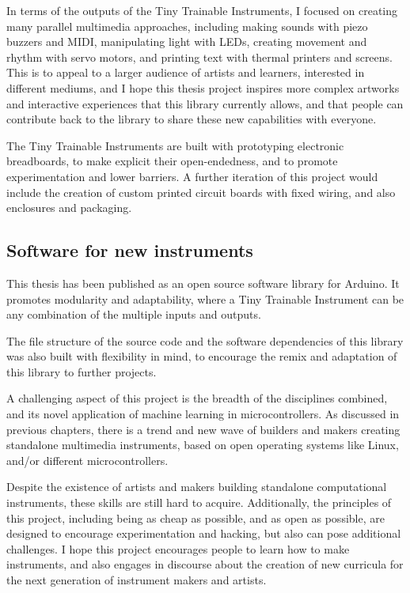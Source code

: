 In terms of the outputs of the Tiny Trainable Instruments, I focused on creating many parallel multimedia approaches, including making sounds with piezo buzzers and MIDI, manipulating light with LEDs, creating movement and rhythm with servo motors, and printing text with thermal printers and screens. This is to appeal to a larger audience of artists and learners, interested in different mediums, and I hope this thesis project inspires more complex artworks and interactive experiences that this library currently allows, and that people can contribute back to the library to share these new capabilities with everyone.

The Tiny Trainable Instruments are built with prototyping electronic breadboards, to make explicit their open-endedness, and to promote experimentation and lower barriers. A further iteration of this project would include the creation of custom printed circuit boards with fixed wiring, and also enclosures and packaging.

\subsection{Software for new instruments}

This thesis has been published as an open source software library for Arduino. It promotes modularity and adaptability, where a Tiny Trainable Instrument can be any combination of the multiple inputs and outputs.

The file structure of the source code and the software dependencies of this library was also built with flexibility in mind, to encourage the remix and adaptation of this library to further projects.

A challenging aspect of this project is the breadth of the disciplines combined, and its novel application of machine learning in microcontrollers. As discussed in previous chapters, there is a trend and new wave of builders and makers creating standalone multimedia instruments, based on open operating systems like Linux, and/or different microcontrollers. 

Despite the existence of artists and makers building standalone computational instruments, these skills are still hard to acquire. Additionally, the principles of this project, including being as cheap as possible, and as open as possible, are designed to encourage experimentation and hacking, but also can pose additional challenges. I hope this project encourages people to learn how to make instruments, and also engages in discourse about the creation of new curricula for the next generation of instrument makers and artists.

